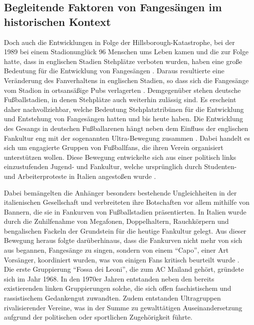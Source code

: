 \subsection{Begleitende Faktoren von Fangesängen im historischen Kontext}
Doch auch die Entwicklungen in Folge der Hillsborough-Katastrophe, bei der 1989 bei einem Stadionunglück 96 Menschen ums Leben kamen und die zur Folge hatte, dass in englischen Stadien Stehplätze verboten wurden, haben eine große Bedeutung für die Entwicklung von Fangesängen \cite[S. 29]{JK07}.
Daraus resultierte eine Veränderung des Fanverhaltens in englischen Stadien, so dass sich die Fangesänge vom Stadion in ortsansäßige Pubs verlagerten \cite{MMQ14}.
Demgegenüber stehen deutsche Fußballstadien, in denen Stehplätze auch weiterhin zulässig sind.
Es erscheint daher nachvollziehbar, welche Bedeutung Stehplatztribünen für die Entwicklung und Entstehung von Fangesängen hatten und bis heute haben.
Die Entwicklung des Gesangs in deutschen Fußballarenen hängt neben dem Einfluss der englischen Fankultur eng mit der sogenannten Ultra-Bewegung zusammen \cite[S. 30]{JK07}.
Dabei handelt es sich um engagierte Gruppen von Fußballfans, die ihren Verein organisiert unterstützen wollen.
Diese Bewegung entwickelte sich aus einer politisch links einzustufenden Jugend- und Fankultur, welche ursprünglich durch Studenten- und Arbeiterproteste in Italien angestoßen wurde \cite[S. 27]{MS12}.

Dabei bemängelten die Anhänger besonders bestehende Ungleichheiten in der italienischen Gesellschaft und verbreiteten ihre Botschaften vor allem mithilfe von Bannern, die sie in Fankurven von Fußballstadien präsentierten.
In Italien wurde durch die Zuhilfenahme von Megafonen, Doppelhaltern, Rauchkörpern und bengalischen Fackeln der Grundstein für die heutige Fankultur gelegt.
Aus dieser Bewegung heraus folgte darüberhinaus, dass die Fankurven nicht mehr von sich aus begannen, Fangesänge zu singen, sondern von einem "`Capo"', einer Art Vorsänger, koordiniert wurden, was von einigen Fans kritisch beurteilt wurde \cite[S. 30]{JK07}.
Die erste Gruppierung "`Fossa dei Leoni"', die zum AC Mailand gehört, gründete sich im Jahr 1968.
In den 1970er Jahren entstanden neben den bereits existierenden linken Gruppierungen solche, die sich offen faschistischem und rassistischem Gedankengut zuwandten.
Zudem entstanden Ultragruppen rivalisierender Vereine, was in der Summe zu gewalttätigen Auseinandersetzung aufgrund der politischen oder sportlichen Zugehörigkeit führte.

